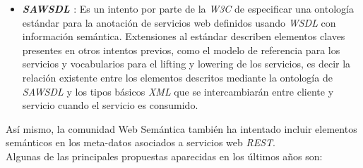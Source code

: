 \begin{itemize}
\item \textbf{\textit{SAWSDL} \cite{sawsdl}}: Es un intento por parte de la \textit{W3C} de especificar una ontolog\'ia est\'andar para la anotaci\'on de servicios web definidos usando \textit{WSDL} con informaci\'on sem\'antica. Extensiones al est\'andar describen elementos claves presentes en otros intentos previos, como el modelo de referencia para los servicios y vocabularios para el lifting y lowering de los servicios, es decir la relaci\'on existente entre los elementos descritos mediante la ontolog\'ia de \textit{SAWSDL} y los tipos b\'asicos \textit{XML} que se intercambiar\'an entre cliente y servicio cuando el servicio es consumido.

\end{itemize}

As\'i mismo, la comunidad Web Sem\'antica tambi\'en ha intentado incluir elementos sem\'anticos en los meta-datos asociados a servicios web \textit{REST}.\\
Algunas de las principales propuestas aparecidas en los \'ultimos a\~nos son:

